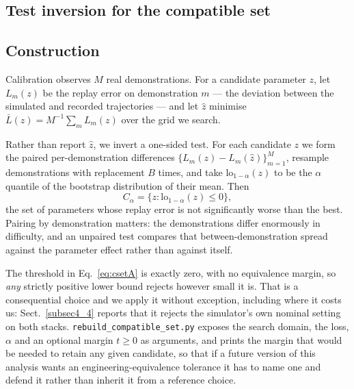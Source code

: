 \documentclass[pdflatex,iicol,sn-apa]{sn-jnl}
\theoremstyle{remark}
\begin{document}
\begin{appendices}

\section{Test inversion for the compatible set}\label{secA}

\subsection{Construction}\label{secA1}

Calibration observes $M$ real demonstrations. For a candidate parameter $z$, let $L_m(z)$ be the
replay error on demonstration $m$ --- the deviation between the simulated and recorded trajectories
--- and let $\hat z$ minimise $\bar L(z) = M^{-1}\sum_m L_m(z)$ over the grid we search.

Rather than report $\hat z$, we invert a one-sided test. For each candidate $z$ we form the paired
per-demonstration differences $\{L_m(z) - L_m(\hat z)\}_{m=1}^{M}$, resample demonstrations with
replacement $B$ times, and take $\mathrm{lo}_{1-\alpha}(z)$ to be the $\alpha$ quantile of the
bootstrap distribution of their mean. Then
\begin{equation}\label{eq:csetA}
C_\alpha = \big\{ z : \mathrm{lo}_{1-\alpha}(z) \le 0 \big\},
\end{equation}
the set of parameters whose replay error is not significantly worse than the best. Pairing by
demonstration matters: the demonstrations differ enormously in difficulty, and an unpaired test
compares that between-demonstration spread against the parameter effect rather than against itself.

The threshold in Eq.~\eqref{eq:csetA} is exactly zero, with no equivalence margin, so \emph{any}
strictly positive lower bound rejects however small it is. That is a consequential choice and we
apply it without exception, including where it costs us: Sect.~\ref{subsec4_4} reports that it
rejects the simulator's own nominal setting on both stacks. \texttt{rebuild\_compatible\_set.py}
exposes the search domain, the loss, $\alpha$ and an optional margin $t \ge 0$ as arguments, and
prints the margin that would be needed to retain any given candidate, so that if a future version of
this analysis wants an engineering-equivalence tolerance it has to name one and defend it rather than
inherit it from a reference choice.


\end{appendices}
\end{document}
